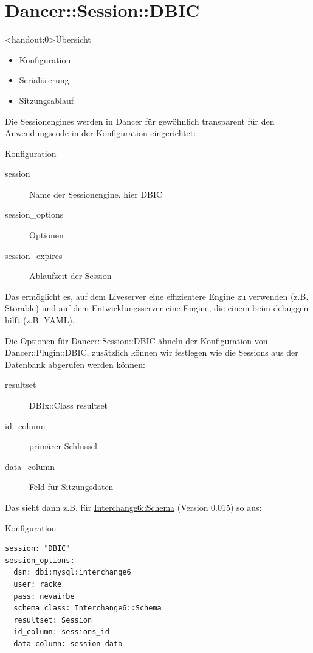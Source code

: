 \section{Dancer::Session::DBIC}

\begin{frame}<handout:0>{Übersicht}
\begin{itemize}
\item Konfiguration
\item Serialisierung
\item Sitzungsablauf
\end{itemize}
\end{frame}

Die Sessionengines werden in Dancer für gewöhnlich transparent
für den Anwendungscode in der Konfiguration eingerichtet:

\begin{frame}{Konfiguration}
\begin{description}
\item[session] Name der Sessionengine, hier DBIC
\item[session\_options] Optionen
\item[session\_expires] Ablaufzeit der Session
\end{description}
\end{frame}

Das ermöglicht es, auf dem Liveserver eine effizientere Engine
zu verwenden (z.B. Storable) und auf dem Entwicklungsserver
eine Engine, die einem beim debuggen hilft (z.B. YAML).

Die Optionen für Dancer::Session::DBIC ähneln der Konfiguration von
Dancer::Plugin::DBIC, zusätzlich können wir festlegen wie
die Sessions aus der Datenbank abgerufen werden können:

\begin{description}
\item[resultset] DBIx::Class resultset
\item[id\_column] primärer Schlüssel
\item[data\_column] Feld für Sitzungsdaten 
\end{description}

Das sieht dann z.B. für \href{https://metacpan.org/pod/Interchange6::Schema}{Interchange6::Schema} (Version 0.015) so aus:

\begin{frame}[fragile]{Konfiguration}
\begin{lstlisting}
session: "DBIC"
session_options:
  dsn: dbi:mysql:interchange6
  user: racke
  pass: nevairbe
  schema_class: Interchange6::Schema
  resultset: Session
  id_column: sessions_id
  data_column: session_data
\end{lstlisting}
\end{frame}

